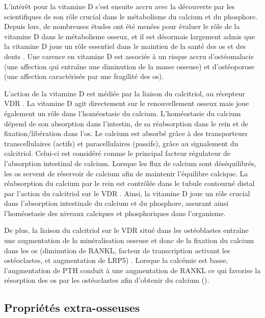 \documentclass[
  a4paper,
  DIV=11,
  numbers=noendperiod,
  listof=totoc]{scrreprt}
\begin{document}
L'intérêt pour la vitamine D s'est ensuite accru avec la découverte par
les scientifiques de son rôle crucial dans le métabolisme du calcium et
du phosphore. Depuis lors, de nombreuses études ont été menées pour
évaluer le rôle de la vitamine D dans le métabolisme osseux, et il est
désormais largement admis que la vitamine D joue un rôle essentiel dans
le maintien de la santé des os et des dents
\autocite{IOM.2011,Goltzman.2018}. Une carence en vitamine D est
associée à un risque accru d'ostéomalacie (une affection qui entraîne
une diminution de la masse osseuse) et d'ostéoporose (une affection
caractérisée par une fragilité des os).

L'action de la vitamine D est médiée par la liaison du calcitriol, au
récepteur \ac{VDR} \autocite{Norman.2008,Dankers.2017}. La vitamine D
agit directement sur le renouvellement osseux mais joue également un
rôle dans l'homéostasie du calcium. L'homéostasie du calcium dépend de
son absorption dans l'intestin, de sa réabsorption dans le rein et de
fixation/libération dans l'os. Le calcium est absorbé grâce à des
transporteurs transcellulaires (actifs) et paracellulaires (passifs),
grâce au signalement du calcitriol. Celui-ci est considéré comme le
principal facteur régulateur de l'absorption intestinal de calcium.
Lorsque les flux de calcium sont déséquilibrés, les os servent de
réservoir de calcium afin de maintenir l'équilibre calcique. La
réabsorption du calcium par le rein est contrôlée dans le tubule
contourné distal par l'action du calcitriol sur le \ac{VDR}
\autocite{Carmeliet.2015}. Ainsi, la vitamine D joue un rôle crucial
dans l'absorption intestinale du calcium et du phosphore, assurant ainsi
l'homéostasie des niveaux calciques et phosphoriques dans l'organisme.

De plus, la liaison du calcitriol sur le VDR situé dans les ostéoblastes
entraîne une augmentation de la minéralisation osseuse et donc de la
fixation du calcium dans les os (diminution de RANKL, facteur de
transcription activant les ostéoclastes, et augmentation de LRP5)
\autocite{Carmeliet.2015}. Lorsque la calcémie est basse, l'augmentation
de \ac{PTH} conduit à une augmentation de RANKL ce qui favorise la
résorption des os par les ostéoclastes afin d'obtenir du calcium
().

\subsection{Propriétés
extra-osseuses}\label{propriuxe9tuxe9s-extra-osseuses}
\end{document}
